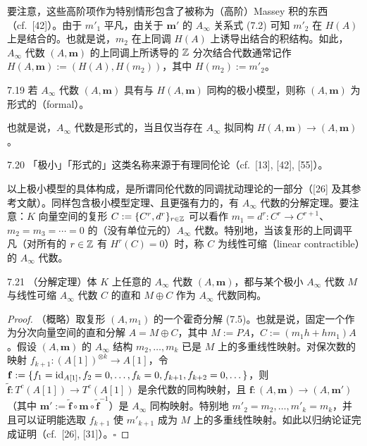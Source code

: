 
要注意，这些高阶项作为特别情形包含了被称为（高阶）Massey 积的东西（cf.\ [42]）。由于 $m'_{1}$ 平凡，由关于 $\mathbf m'$ 的 $A_\infty$ 关系式 (7.2) 可知 $m'_{2}$ 在 $H(A)$ 上是结合的。也就是说，$m_{2}$ 在上同调 $H(A)$ 上诱导出结合的积结构。如此，$A_\infty$ 代数 $(A,\mathbf m)$ 的上同调上所诱导的 $\mathbb{Z}$ 分次结合代数通常记作 $H(A,\mathbf m):=(H(A),H(m_{2}))$，其中 $H(m_{2}):=m'_{2}$。

\begin{definition}{7.19}
若 $A_\infty$ 代数 $(A,\mathbf m)$ 具有与 $H(A,\mathbf m)$ 同构的极小模型，则称 $(A,\mathbf m)$ 为形式的（formal）。
\end{definition}

也就是说，$A_\infty$ 代数是形式的，当且仅当存在 $A_\infty$ 拟同构 $H(A,\mathbf m)\to(A,\mathbf m)$。

\begin{remark}{7.20}
「极小」「形式的」这类名称来源于有理同伦论（cf.\ [13], [42], [55]）。
\end{remark}

以上极小模型的具体构成，是所谓同伦代数的同调扰动理论的一部分（[26] 及其参考文献）。同样包含极小模型定理、且更强有力的，有 $A_\infty$ 代数的分解定理。要注意：$K$ 向量空间的复形 $C:=\{C^{r},d^{r}\}_{r\in\mathbb{Z}}$ 可以看作 $m_{1}=d^{r}\colon C^{r}\to C^{r+1}$、$m_{2}=m_{3}=\cdots=0$ 的（没有单位元的）$A_\infty$ 代数。特别地，当该复形的上同调平凡（对所有的 $r\in\mathbb{Z}$ 有 $H^{r}(C)=0$）时，称 $C$ 为线性可缩（linear contractible）的 $A_\infty$ 代数。

\begin{theorem}{7.21}
（分解定理）体 $K$ 上任意的 $A_\infty$ 代数 $(A,\mathbf m)$，都与某个极小 $A_\infty$ 代数 $M$ 与线性可缩 $A_\infty$ 代数 $C$ 的直和 $M\oplus C$ 作为 $A_\infty$ 代数同构。
\end{theorem}

\begin{proof}
（概略）取复形 $(A,m_{1})$ 的一个霍奇分解 (7.5)。也就是说，固定一个作为分次向量空间的直和分解 $A=M\oplus C$，其中 $M:=PA$，$C:=(m_{1}h+hm_{1})A$。假设 $(A,\mathbf m)$ 的 $A_\infty$ 结构 $m_{2},\dots,m_{k}$ 已是 $M$ 上的多重线性映射。对保次数的映射 $f_{k+1}\colon(A[1])^{\otimes k}\to A[1]$，令 $\mathbf f:=\{f_{1}=\mathrm{id}_{A[1]},f_{2}=0,\dots,f_{k}=0,f_{k+1},f_{k+2}=0,\dots\}$，则 $\tilde{\mathbf f}\colon T^{c}(A[1])\to T^{c}(A[1])$ 是余代数的同构映射，且 $\mathbf f\colon(A,\mathbf m)\to(A,\mathbf m')$（其中 $\mathbf m':=\tilde{\mathbf f}\circ\mathbf m\circ\tilde{\mathbf f}^{-1}$）是 $A_\infty$ 同构映射。特别地 $m'_{2}=m_{2},\dots,m'_{k}=m_{k}$，并且可以证明能选取 $f_{k+1}$ 使 $m'_{k+1}$ 成为 $M$ 上的多重线性映射。如此以归纳论证完成证明（cf.\ [26], [31]）。\hfill$\square$
\end{proof}

